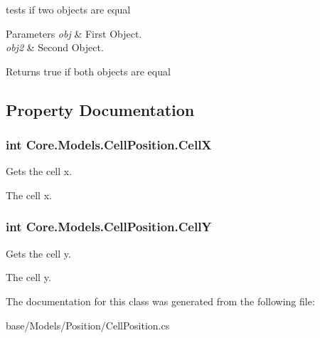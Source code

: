 tests if two objects are equal 


\begin{DoxyParams}{Parameters}
{\em obj} & First Object.\\
\hline
{\em obj2} & Second Object.\\
\hline
\end{DoxyParams}
\begin{DoxyReturn}{Returns}
true if both objects are equal
\end{DoxyReturn}


\subsection{Property Documentation}
\hypertarget{classCore_1_1Models_1_1CellPosition_a4daf526cdfe22a21d679d3e1b032d096}{}
\subsubsection[{Cell\+X}]{\setlength{\rightskip}{0pt plus 5cm}int Core.\+Models.\+Cell\+Position.\+Cell\+X\hspace{0.3cm}{\ttfamily [get]}}\label{classCore_1_1Models_1_1CellPosition_a4daf526cdfe22a21d679d3e1b032d096}


Gets the cell x. 

The cell x.\hypertarget{classCore_1_1Models_1_1CellPosition_a91ba33cce7deac7d2ec875812c3f73dc}{}
\subsubsection[{Cell\+Y}]{\setlength{\rightskip}{0pt plus 5cm}int Core.\+Models.\+Cell\+Position.\+Cell\+Y\hspace{0.3cm}{\ttfamily [get]}}\label{classCore_1_1Models_1_1CellPosition_a91ba33cce7deac7d2ec875812c3f73dc}


Gets the cell y. 

The cell y.

The documentation for this class was generated from the following file\+:\begin{DoxyCompactItemize}
\item 
base/\+Models/\+Position/Cell\+Position.\+cs\end{DoxyCompactItemize}
